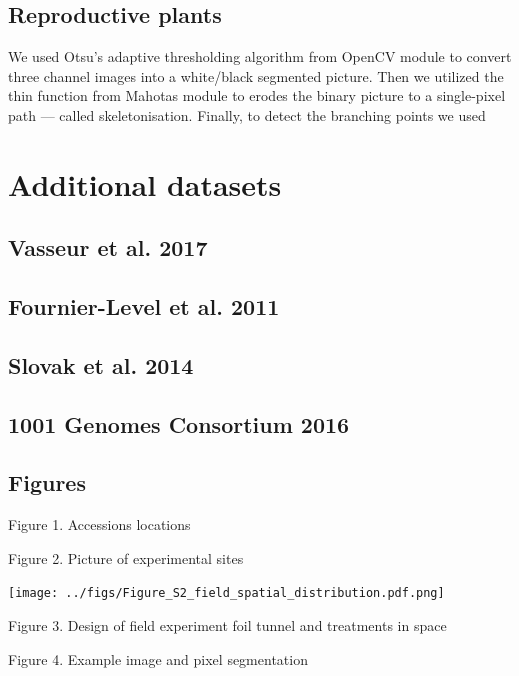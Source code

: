 \documentclass[]{article}
\begin{document}
\subsection{Reproductive plants}\label{reproductive-plants}

We used Otsu's adaptive thresholding algorithm from OpenCV module to
convert three channel images into a white/black segmented picture. Then
we utilized the thin function from Mahotas module to erodes the binary
picture to a single-pixel path --- called skeletonisation. Finally, to
detect the branching points we used

\section{Additional datasets}\label{additional-datasets}

\subsection{Vasseur et al. 2017}\label{vasseur-et-al.-2017}

\subsection{Fournier-Level et al.
2011}\label{fournier-level-et-al.-2011}

\subsection{Slovak et al. 2014}\label{slovak-et-al.-2014}

\subsection{1001 Genomes Consortium 2016}\label{genomes-consortium-2016}

\subsection{Figures}\label{figures}

Figure 1. Accessions locations

Figure 2. Picture of experimental sites

\centerline{\texttt{[image: ../figs/Figure\_S2\_field\_spatial\_distribution.pdf.png]}}
Figure 3. Design of field experiment foil tunnel and treatments in space

Figure 4. Example image and pixel segmentation
\end{document}
